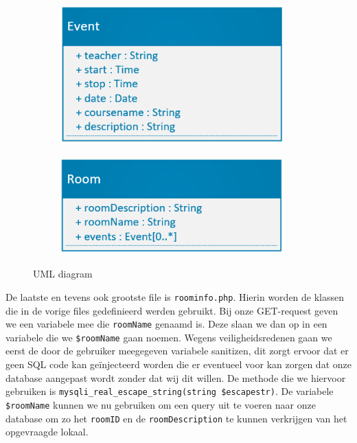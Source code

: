 \documentclass[a4paper,kul]{kulakarticle} %
\begin{document}
\begin{figure}[h]
	\centering
	\begin{subfigure}{0.45\textwidth}
		\centering
		\includegraphics[width=0.95\textwidth]{EventUML.png}
	\end{subfigure}
	\begin{subfigure}{0.45\textwidth}
		\centering
		\includegraphics[width=0.95\textwidth]{RoomUML.png}
	\end{subfigure}
	\caption{UML diagram}
	\label{fig:uml}
\end{figure}
De laatste en tevens ook grootste file is \verb|roominfo.php|. Hierin worden de klassen die in de vorige files gedefinieerd werden gebruikt. Bij onze GET-request geven we een variabele mee die \verb|roomName| genaamd is. Deze slaan we dan op in een variabele die we \verb|$roomName| gaan noemen. Wegens veiligheidsredenen gaan we eerst de door de gebruiker meegegeven variabele sanitizen, dit zorgt ervoor dat er geen SQL code kan geïnjecteerd worden die er eventueel voor kan zorgen dat onze database aangepast wordt zonder dat wij dit willen. De methode die we hiervoor gebruiken is \verb|mysqli_real_escape_string(string $escapestr)|. De variabele \verb|$roomName| kunnen we nu gebruiken om een query uit te voeren naar onze database om zo het \verb|roomID| en de \verb|roomDescription| te kunnen verkrijgen van het opgevraagde lokaal. 
\newpage
\end{document}
